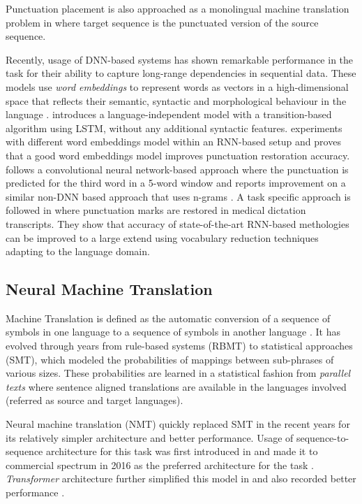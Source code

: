 Punctuation placement is also approached as a monolingual machine translation problem in \cite{peitz2011modeling, Cho2017NMTbasedSA, Paulik, Klejch} where target sequence is the punctuated version of the source sequence. 
  
Recently, usage of DNN-based systems has shown remarkable performance in the task for their ability to capture long-range dependencies in sequential data. These models use \textit{word embeddings} to represent words as vectors in a high-dimensional space that reflects their semantic, syntactic and morphological behaviour in the language \citep{mikolov_wordvec}. \cite{ballesterosneural} introduces a language-independent model with a transition-based algorithm using LSTM, without any additional syntactic features. \cite{Treviso} experiments with different word embeddings model within an RNN-based setup and proves that a good word embeddings model improves punctuation restoration accuracy. \cite{Che2016PunctuationPF} follows a convolutional neural network-based approach where the punctuation is predicted for the third word in a 5-word window and reports improvement on a similar non-DNN based approach that uses n-grams \citep{ueffing2013improved}. A task specific approach is followed in \cite{emrai} where punctuation marks are restored in medical dictation transcripts. They show that accuracy of state-of-the-art RNN-based methologies can be improved to a large extend using vocabulary reduction techniques adapting to the language domain. 

\subsection{Neural Machine Translation}
\label{sota:nmt}

Machine Translation is defined as the automatic conversion of a sequence of symbols in one language to a sequence of symbols in another language \citep{bengio_dl}. It has evolved through years from rule-based systems (RBMT) to statistical approaches (SMT), which modeled the probabilities of mappings between sub-phrases of various sizes. These probabilities are learned in a statistical fashion from \textit{parallel texts} where sentence aligned translations are available in the languages involved (referred as source and target languages). 

Neural machine translation (NMT) quickly replaced SMT in the recent years for its relatively simpler architecture and better performance. Usage of sequence-to-sequence architecture for this task was first introduced in \cite{sutskever} and made it to commercial spectrum in 2016 as the preferred architecture for the task \citep{google_nmt}. \textit{Transformer} architecture further simplified this model in and also recorded better performance \citep{transformer}.

